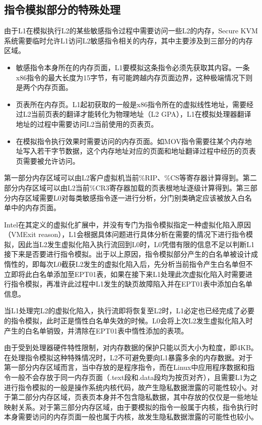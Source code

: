 \subsection{指令模拟部分的特殊处理}

由于L1在模拟执行L2的某些敏感指令过程中需要访问一些L2的内存，Secure KVM系统需要临时允许L1访问L2敏感指令相关的内存，其中主要涉及到三部分的内存区域。

\begin{itemize}
\item 敏感指令本身所在的内存页面，L1要模拟这条指令必须先获取其内容。一条x86指令的最大长度为15字节，有可能跨越内存页面边界，这种极端情况下则是两个内存页面。
\item 页表所在内存页。L1起初获取的一般是x86指令所在的虚拟线性地址，需要经过L2当前页表的翻译才能转化为物理地址（L2 GPA），L1在模拟处理器翻译地址的过程中需要访问L2当前使用的页表页。
\item 在模拟指令执行效果时需要访问的内存页面。如MOV指令需要往某个内存地址写入若干字节数据，这个内存地址对应的页面和地址翻译过程中经历的页表页需要被允许访问。
\end{itemize}

第一部分内存区域可以由L2客户虚拟机当前\%RIP、\%CS等寄存器计算得到。第二部分内存区域可以由L2当前\%CR3寄存器加载的页表根地址逐级计算得到。第三部分内存区域需要L0对每类敏感指令逐一进行分析，分门别类确定应该被放入白名单中的内存页面。

Intel在其定义的虚拟化扩展中，并没有专门为指令模拟指定一种虚拟化陷入原因（VMExit reason），L1会根据具体问题进行具体分析在需要的情况下进行指令模拟，因此当L2发生虚拟化陷入执行流回到L0时，L0凭借有限的信息不足以判断L1接下来是否要进行指令模拟。出于以上原因，指令模拟部分产生的白名单被设计成惰性的，即每次L0截获L2发生的虚拟化陷入后，先分析当前指令产生白名单但不立即将此白名单添加至EPT01表，如果在接下来L1处理此次虚拟化陷入时需要进行指令模拟，再准许此过程中L1发生的缺页故障陷入并在EPT01表中添加白名单信息。

当L1处理完L2的虚拟化陷入，执行流即将恢复至L2时，L1必定也已经完成了必要的指令模拟，此时正是惰性白名单失效的时候。L0会将上次L2发生虚拟化陷入时产生的白名单销毁，并清除在EPT01表中惰性添加的表项。

由于受到处理器硬件特性限制，对内存数据的保护只能以页大小为粒度，即4KB。在处理指令模拟这种特殊情况时，L2不可避免要向L1暴露多余的内存数据。对于第一部分内存区域而言，当中存放的是程序指令，而在Linux中应用程序数据和指令一般不会存放于同一内存页面（.text段和.data段均为按页对齐），且需要L1为之进行指令模拟的一般是操作系统内核代码，故产生隐私数据泄露的可能性较小。对于第二部分内存区域，页表页本身并不包含隐私数据，其中存放的仅仅是一些地址映射关系。对于第三部分内存区域，由于要模拟的指令一般属于内核，指令执行时本身需要访问的内存页面一般也属于内核，故发生隐私数据泄露的可能性也较小。

